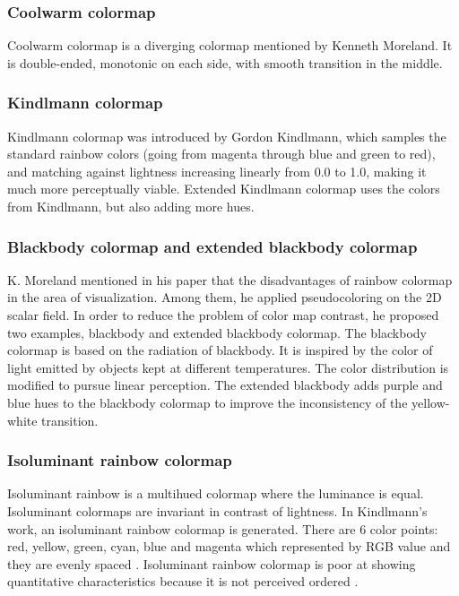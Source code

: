 \documentclass[a4paper, 12pt]{report}
\begin{document}
\subsubsection*{Coolwarm colormap}
Coolwarm colormap is a diverging colormap mentioned by Kenneth Moreland. It is double-ended, monotonic on each side, with smooth transition in the middle.

\subsubsection*{Kindlmann colormap}
Kindlmann colormap was introduced by Gordon Kindlmann, which samples the standard rainbow colors (going from magenta through blue and green to red), and matching against lightness increasing linearly from 0.0 to 1.0, \cite{kindlmann} making it much more perceptually viable. Extended Kindlmann colormap uses the colors from Kindlmann, but also adding more hues.

\subsubsection*{Blackbody colormap and extended blackbody colormap}
K. Moreland mentioned in his paper \cite{moreland2016} that the disadvantages of rainbow colormap in the area of visualization. Among them, he applied pseudocoloring on the 2D scalar field. In order to reduce the problem of color map contrast, he proposed two examples, blackbody and extended blackbody colormap. The blackbody colormap is based on the radiation of blackbody. It is inspired by the color of light emitted by objects kept at different temperatures. The color distribution is modified to pursue linear perception. The extended blackbody adds purple and blue hues to the blackbody colormap to improve the inconsistency of the yellow-white transition. 

\subsubsection*{Isoluminant rainbow colormap}
Isoluminant rainbow is a multihued colormap where the luminance is equal. Isoluminant colormaps are invariant in contrast of lightness. In Kindlmann’s work, an isoluminant rainbow colormap is generated. There are 6 color points: red, yellow, green, cyan, blue and magenta which represented by RGB value and they are evenly spaced \cite{kindlmann}. Isoluminant rainbow colormap is poor at showing quantitative characteristics because it is not perceived ordered \cite{moreland2019}. 
\end{document}
